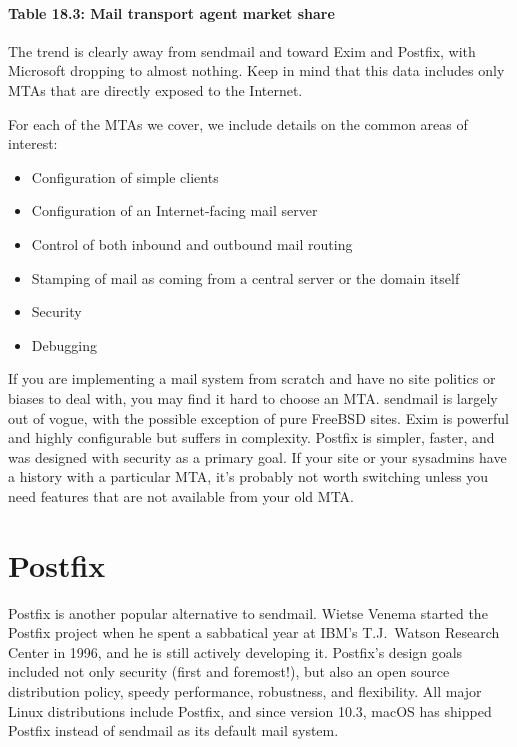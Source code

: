 \paragraph[{Table 18.3: }Mail transport agent market
share]{\texorpdfstring{{Table 18.3:
}\protect\hypertarget{part0026_split_023.htmlux5cux23_idTextAnchor1041}{}{}\protect\hypertarget{part0026_split_023.htmlux5cux23_idTextAnchor1042}{}{}Mail
transport agent market
share}{Table 18.3: Mail transport agent market share}}


\protect\hypertarget{part0026_split_023.htmlux5cux23_idIndexMarker2492}{}{}The
trend is clearly away from {sendmail} and toward Exim and Postfix, with
Microsoft dropping to almost nothing. Keep in mind that this data
includes only MTAs that are directly exposed to the Internet.

For each of the MTAs we cover, we include details on the common areas of
interest:

\begin{itemize}
\item
  Configuration of simple clients
\item
  Configuration of an Internet-facing mail server
\item
  Control of both inbound and outbound mail routing
\item
  Stamping of mail as coming from a central server or the domain itself
\item
  Security
\item
  Debugging
\end{itemize}

If you are implementing a mail system from scratch and have no site
politics or biases to deal with, you may find it hard to choose an MTA.
{sendmail} is largely out of vogue, with the possible exception of pure
FreeBSD sites. Exim is powerful and highly configurable but suffers in
complexity. Postfix is simpler, faster, and was designed with security
as a primary goal. If your site or your sysadmins have a history with a
particular MTA, it's probably not worth switching unless you need
features that are not available from your old MTA.




\section{Postfix}
\label{sec:postfix}

Postfix is another popular alternative to {sendmail}.
Wietse Venema started the Postfix project when he spent a sabbatical year at IBM's T.J.\ Watson Research Center in 1996, and he is still actively developing it.
Postfix's design goals included not only security (first and foremost!), but also an open source distribution policy, speedy performance, robustness, and flexibility.
All major Linux distributions include Postfix, and since version 10.3, macOS has shipped Postfix instead of {sendmail} as its default mail system.

